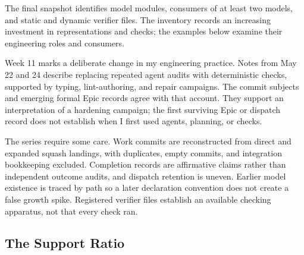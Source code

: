 
The final snapshot identifies  model modules,  consumers of at least two models, and  static and  dynamic verifier files. The inventory records an increasing investment in representations and checks; the examples below examine their engineering roles and consumers.


Week 11 marks a deliberate change in my engineering practice. Notes from May 22 and 24 describe replacing repeated agent audits with deterministic checks, supported by typing, lint-authoring, and repair campaigns. The commit subjects and emerging formal Epic records agree with that account. They support an interpretation of a hardening campaign; the first surviving Epic or dispatch record does not establish when I first used agents, planning, or checks.


The series require some care. Work commits are reconstructed from direct and expanded squash landings, with duplicates, empty commits, and integration bookkeeping excluded. Completion records are affirmative claims rather than independent outcome audits, and dispatch retention is uneven. Earlier model existence is traced by path so a later declaration convention does not create a false growth spike. Registered verifier files establish an available checking apparatus, not that every check ran.

\subsection{The Support Ratio}\label{heading:support-ratio-curve}



